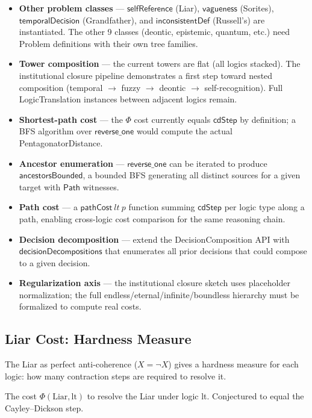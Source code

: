 \begin{itemize}
  \item \textbf{Other problem classes} --- $\mathsf{selfReference}$ (Liar),
    $\mathsf{vagueness}$ (Sorites), $\mathsf{temporalDecision}$ (Grandfather),
    and $\mathsf{inconsistentDef}$ (Russell's) are instantiated.
    The other 9 classes (deontic, epistemic, quantum, etc.)
    need \textsf{Problem} definitions with their own tree families.
  \item \textbf{Tower composition} --- the current towers are flat (all logics stacked).
    The institutional closure pipeline demonstrates a first step toward
    nested composition (temporal $\to$ fuzzy $\to$ deontic $\to$ self-recognition).
    Full \textsf{LogicTranslation} instances between adjacent logics remain.
  \item \textbf{Shortest-path cost} --- the $\Phi$ cost currently equals
    $\textsf{cdStep}$ by definition; a BFS algorithm over $\textsf{reverse\_one}$
    would compute the actual PentagonatorDistance.
  \item \textbf{Ancestor enumeration} --- $\mathsf{reverse\_one}$ can be iterated
    to produce $\mathsf{ancestorsBounded}$, a bounded BFS generating all distinct
    sources for a given target with $\mathsf{Path}$ witnesses.
  \item \textbf{Path cost} --- a $\mathsf{pathCost}\ lt\ p$ function summing
    $\mathsf{cdStep}$ per logic type along a path, enabling cross-logic cost
    comparison for the same reasoning chain.
  \item \textbf{Decision decomposition} --- extend the DecisionComposition API
    with $\mathsf{decisionDecompositions}$ that enumerates all prior decisions
    that could compose to a given decision.
  \item \textbf{Regularization axis} --- the institutional closure sketch
    uses placeholder normalization; the full endless/eternal/infinite/boundless
    hierarchy must be formalized to compute real costs.
\end{itemize}

\subsection{Liar Cost: Hardness Measure}

The Liar as perfect anti-coherence ($X = \neg X$) gives a hardness measure for each logic:
how many contraction steps are required to resolve it.

\begin{definition}
\label{def:liar_cost}
\leanok
{}
The cost $\Phi(\text{Liar}, \text{lt})$ to resolve the Liar under logic \textsf{lt}.
Conjectured to equal the Cayley--Dickson step.
\end{definition}

